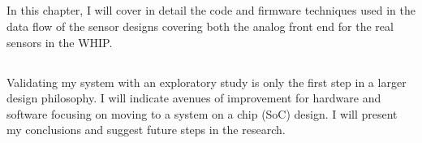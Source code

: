 \subsection{  }
In this chapter, I will cover in detail the code and firmware techniques used in the data flow of the sensor designs covering both the analog front end for the real sensors in the WHIP.

\subsection{ }
\label{subsec:Chapter8Conclusions}
Validating my system with an exploratory study is only the first step in a larger design philosophy. I will indicate avenues of improvement for hardware and software focusing on moving to a system on a chip (SoC) design. I will present my conclusions and suggest future steps in the research.


